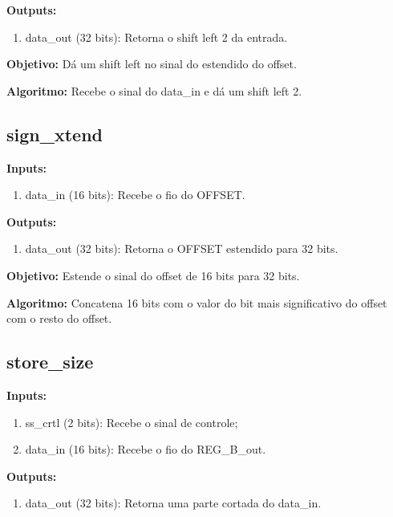 \textbf{Outputs:}

\begin{enumerate}
    \item data\_out (32 bits): Retorna o shift left 2 da entrada.
\end{enumerate}

\textbf{Objetivo:} Dá um shift left no sinal do estendido do offset.

\textbf{Algoritmo:} Recebe o sinal do data\_in e dá um shift left 2.

\newpage

\subsection{sign\_xtend}

\textbf{Inputs:}

\begin{enumerate}
    \item data\_in (16 bits): Recebe o fio do OFFSET.

\end{enumerate}

\textbf{Outputs:}

\begin{enumerate}
    \item data\_out (32 bits): Retorna o OFFSET estendido para 32 bits.
\end{enumerate}

\textbf{Objetivo:} Estende o sinal do offset de 16 bits para 32 bits.

\textbf{Algoritmo:} Concatena 16 bits com o valor do bit mais significativo do offset com o resto do offset.



\subsection{store\_size}

\textbf{Inputs:}

\begin{enumerate}
    \item ss\_crtl (2 bits): Recebe o sinal de controle;
    \item data\_in (16 bits): Recebe o fio do REG\_B\_out.

\end{enumerate}

\textbf{Outputs:}

\begin{enumerate}
    \item data\_out (32 bits): Retorna uma parte cortada do data\_in.
\end{enumerate}

